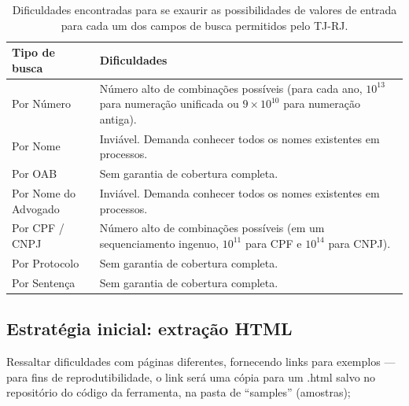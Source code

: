 \begin{table}[htb]
    \centering
    \begin{tabular}{lp{}}
        \toprule
        Tipo de busca & Dificuldades \\
        \midrule
        Por Número & Número alto de combinações possíveis (para cada ano, $10^{13}$ para numeração unificada ou $9 \times 10^{10}$ para numeração antiga). \\
        Por Nome & Inviável. Demanda conhecer todos os nomes existentes em processos. \\
        Por OAB & Sem garantia de cobertura completa. \\
        Por Nome do Advogado & Inviável. Demanda conhecer todos os nomes existentes em processos. \\
        Por CPF / CNPJ & Número alto de combinações possíveis (em um sequenciamento ingenuo, $10^{11}$ para CPF e $10^{14}$ para CNPJ). \\
        Por Protocolo & Sem garantia de cobertura completa. \\
        Por Sentença & Sem garantia de cobertura completa. \\
        \bottomrule
    \end{tabular}
    \caption{%
        Dificuldades encontradas para se exaurir as possibilidades de valores
        de entrada para cada um dos campos de busca permitidos pelo TJ-RJ.
    }
    \label{tbl:dificuldades-tipos-de-busca}
\end{table}




\subsection{Estratégia inicial: extração HTML}

\begin{todolist}
    \item Ressaltar dificuldades com páginas diferentes, fornecendo links para
          exemplos --- para fins de reprodutibilidade, o link será uma cópia
          para um .html salvo no repositório do código da ferramenta, na pasta
          de ``samples'' (amostras);
\end{todolist}

